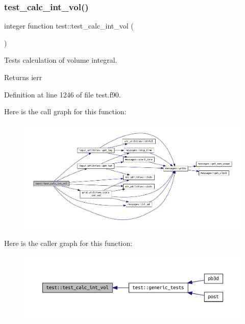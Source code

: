 \subsubsection{\texorpdfstring{test\+\_\+calc\+\_\+int\+\_\+vol()}{test\_calc\_int\_vol()}}
{\footnotesize\ttfamily integer function test\+::test\+\_\+calc\+\_\+int\+\_\+vol (\begin{DoxyParamCaption}{ }\end{DoxyParamCaption})}



Tests calculation of volume integral. 

\begin{DoxyReturn}{Returns}
ierr 
\end{DoxyReturn}


Definition at line 1246 of file test.\+f90.

Here is the call graph for this function\+:\nopagebreak
\begin{figure}[H]
\begin{center}
\leavevmode
\includegraphics[width=350pt]{namespacetest_a0d4cb791bf762b2e52260fea7644a3ee_cgraph}
\end{center}
\end{figure}
Here is the caller graph for this function\+:\nopagebreak
\begin{figure}[H]
\begin{center}
\leavevmode
\includegraphics[width=350pt]{namespacetest_a0d4cb791bf762b2e52260fea7644a3ee_icgraph}
\end{center}
\end{figure}
\mbox{\label{namespacetest_ac574f08ba400cd61070a6a6f13f6f7ee}} 
